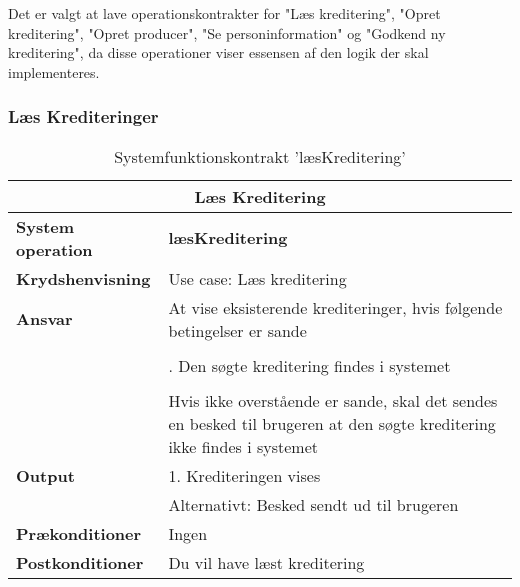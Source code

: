 \noindent
Det er valgt at lave operationskontrakter for "Læs kreditering", "Opret kreditering", "Opret producer", "Se personinformation" og "Godkend ny kreditering", da disse operationer viser essensen af den logik der skal implementeres. 


\subsubsection{Læs Krediteringer}
\begin{table}[h]
    \centering
    \begin{tabular}{| p{4cm} | p{12cm} |}
    \hline
    \multicolumn{2}{|c|}{\textbf{Læs Kreditering}}\\
    \hline
    \textbf{System operation}       & \textbf{læsKreditering} \\ \hline
    \textbf{Krydshenvisning}        & Use case: Læs kreditering \\ \hline
    \textbf{Ansvar}                 & At vise eksisterende krediteringer, hvis følgende betingelser er sande \\ 
                                    & \\
                                    & \quad 1. Den søgte kreditering findes i systemet\\
                                    & \\
                                    & Hvis ikke overstående er sande, skal det sendes en besked til brugeren at den søgte kreditering ikke findes i systemet\\\hline
    \textbf{Output}                 & 1. Krediteringen vises\\ 
                                    & Alternativt: Besked sendt ud til brugeren\\ \hline
    \textbf{Prækonditioner}         & Ingen \\ \hline
    \textbf{Postkonditioner}        & Du vil have læst kreditering \\ \hline
    \end{tabular}
    \caption{Systemfunktionskontrakt 'læsKreditering'}
    \label{tab:kontrakter_læs_kreditering}
\end{table}


